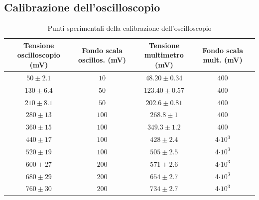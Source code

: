 \documentclass[]{article}
\begin{document}
\subsection{Calibrazione dell'oscilloscopio}
\begin{center}
	\begin{table}[H]
	\begin{tabular}{|c|c|c|c|c|}
		\hline
		Tensione oscilloscopio (mV)& Fondo scala oscillos. (mV) & Tensione multimetro (mV) & Fondo scala mult. (mV) \\
		\hline
		$ 50\pm 2.1 $ &$ 10 $ & $ 48.20\pm 0.34 $ &400\\
		\hline
		$ 130\pm 6.4$ &$ 50 $ & $ 123.40\pm 0.57 $ &400\\
		\hline
		$ 210\pm 8.1 $ &$ 50 $ & $ 202.6\pm 0.81 $ &400\\
		\hline
		$ 280\pm 13$ &$ 100 $ & $ 268.8\pm 1 $ &400\\
		\hline
		$ 360\pm 15 $ &$ 100 $ & $ 349.3\pm 1.2 $ &400\\
		\hline
		$ 440\pm 17 $ &$ 100 $ & $ 428\pm 2.4 $ &4$\cdot10^3$\\
		\hline
		$ 520\pm 19 $ &$ 100 $ & $ 505\pm 2.5 $ &4$\cdot10^3$\\
		\hline
		$ 600\pm 27 $ &$ 200 $ & $ 571\pm 2.6 $ &4$\cdot10^3$\\
		\hline
		$ 680\pm 29 $ &$ 200 $ & $ 654\pm 2.7 $&4$\cdot10^3$ \\
		\hline
		$ 760\pm 30 $ &$ 200 $ & $ 734\pm 2.7 $&4$\cdot10^3$ \\
		\hline
		
	\end{tabular}
\caption{Punti sperimentali della calibrazione dell'oscilloscopio}
\label{tab:calibrazione}
\end{table}
\end{center}
\end{document}
